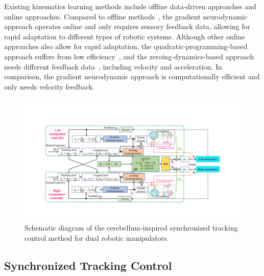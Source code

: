 \documentclass[journal,twoside,web]{ieeecolor}
\begin{document}
Existing kinematics learning methods include offline data-driven approaches and online approaches. Compared to offline methods~\cite{Cursi2022RAL}, the gradient neurodynamic approach operates online and only requires sensory feedback data, allowing for rapid adaptation to different types of robotic systems. Although other online approaches also allow for rapid adaptation, the quadratic-programming-based approach suffers from low efficiency~\cite{Yip2016RAL}, and the zeroing-dynamics-based approach needs different feedback data~\cite{Yang2020}, including velocity and acceleration. In comparison, the gradient neurodynamic approach is computationally efficient and only needs velocity feedback.


\begin{figure}[!t]
    \centering
    \includegraphics[width=0.9\linewidth]{figures/FIG2_TII-24-5492.pdf}
    \caption{Schematic diagram of the cerebellum-inspired synchronized tracking control method for dual robotic manipulators.
    }
    \label{Fig:KinematicController}
\end{figure}

\subsection{Synchronized Tracking Control}
\end{document}
